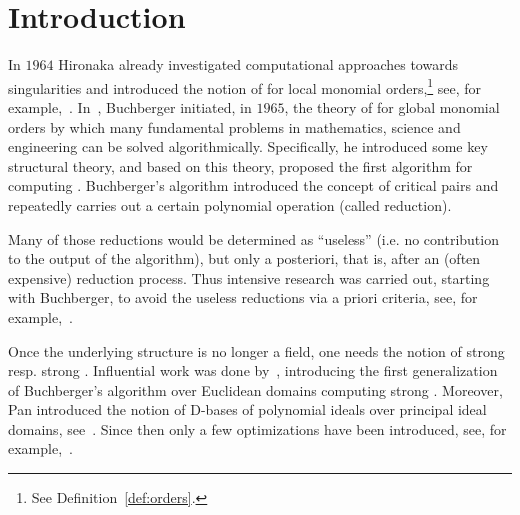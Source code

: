\section{Introduction}
\label{sec:intro} In $1964$ Hironaka already investigated
computational approaches towards singularities and introduced the notion of
\stbs for local monomial orders,\footnote{See Definition~\ref{def:orders}.} see, for
example,~\cite{hironaka11964, hironaka21964, grauert1972}.
In~\cite{bGroebner1965, bGroebner1965eng}, Buchberger initiated, in $1965$, the theory
of \gbs for global monomial orders by which many fundamental problems in mathematics, science
and engineering can be solved algorithmically. Specifically, he introduced some key
structural theory, and based on
this theory, proposed the first algorithm for computing \gbs.
Buchberger's algorithm introduced the concept of critical pairs and repeatedly carries out a certain
polynomial operation (called reduction).

Many of those reductions would be
determined as ``useless'' (i.e. no contribution to the output of the algorithm),
but only a posteriori, that is, after an (often expensive) reduction process.
Thus intensive research was carried out, starting with Buchberger, to avoid the
useless reductions via a priori criteria, see,  for
example,~\cite{bGroebnerCriterion1979,buchberger2ndCriterion1985,gmInstallation1988}.

Once the underlying structure is no longer a field, one needs
the notion of strong \gbs resp. strong \stbs. Influential work was done
by~\cite{kapur1988}, introducing the first generalization of Buchberger's
algorithm over Euclidean domains computing strong \gbs. Moreover, Pan introduced
the notion of D-bases of polynomial ideals over principal ideal domains,
    see~\cite{PAN1989}. Since then only a few
optimizations have been introduced, see, for example,~\cite{Wienand2011,
    lichtblau2012, eppSigZ2017}.

